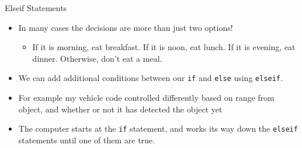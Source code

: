 {}\documentclass[letterpaper,
compress,
xcolor=x11names,
]{beamer}
\begin{document}
\begin{frame}{Elseif Statements}
	\footnotesize
	\begin{itemize}
		\item In many cases the decisions are more than just two options!
		\begin{itemize}
			\item If it is morning, eat breakfast. If it is noon, eat lunch. If it is evening, eat dinner. Otherwise, don't eat a meal.
		\end{itemize}
		\item<2-> We can add additional conditions between our \texttt{if} and \texttt{else} using \texttt{elseif}.
		\item<2-> For example my vehicle code controlled differently based on range from object, and whether or not it has detected the object yet
		\begin{center}
		\end{center}
		\item<3-> The computer starts at the \texttt{if} statement, and works its way down the \texttt{elseif} statements until one of them are true.
	\end{itemize}
\end{frame}
\end{document}
